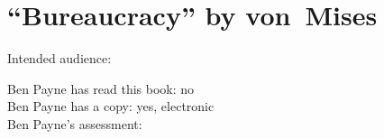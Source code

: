 \section{``Bureaucracy'' by von~Mises\label{review:vonMises_bur}}

\cite{1996_Mises}

Intended audience:

Ben Payne has read this book: no\\
Ben Payne has a copy: yes, electronic\\
Ben Payne's assessment:
